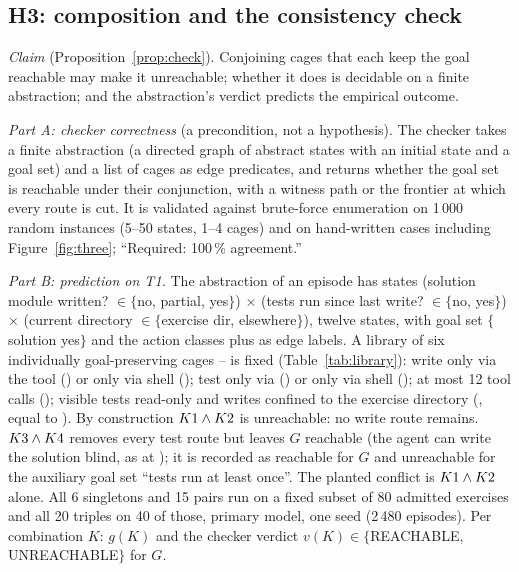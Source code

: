 
\subsection{H3: composition and the consistency check}
\label{sec:h3}

\emph{Claim} (Proposition~\ref{prop:check}). Conjoining cages that each keep the goal reachable may make it unreachable; whether it does is decidable on a finite abstraction; and the abstraction's verdict predicts the empirical outcome.

\emph{Part A: checker correctness} (a precondition, not a hypothesis). The checker takes a finite abstraction (a directed graph of abstract states with an initial state and a goal set) and a list of cages as edge predicates, and returns whether the goal set is reachable under their conjunction, with a witness path or the frontier at which every route is cut. It is validated against brute-force enumeration on 1\,000 random instances (5--50 states, 1--4 cages) and on hand-written cases including Figure~\ref{fig:three}; ``Required: 100\,\% agreement.''

\emph{Part B: prediction on T1.} The abstraction of an episode has states (solution module written? $\in \{$no, partial, yes$\}$) $\times$ (tests run since last write? $\in \{$no, yes$\}$) $\times$ (current directory $\in \{$exercise dir, elsewhere$\}$), twelve states, with goal set $\{$solution yes$\}$ and the action classes plus  as edge labels. A library of six individually goal-preserving cages -- is fixed (Table~\ref{tab:library}): write only via the  tool () or only via shell (); test only via  () or only via shell (); at most 12 tool calls (); visible tests read-only and writes confined to the exercise directory (, equal to ). By construction $K1 \wedge K2$ is unreachable: no write route remains. $K3 \wedge K4$ removes every test route but leaves $G$ reachable (the agent can write the solution blind, as at ); it is recorded as reachable for $G$ and unreachable for the auxiliary goal set ``tests run at least once''. The planted conflict is $K1 \wedge K2$ alone. All 6 singletons and 15 pairs run on a fixed subset of 80 admitted exercises and all 20 triples on 40 of those, primary model, one seed (2\,480 episodes). Per combination $K$: $g(K)$ and the checker verdict $v(K) \in \{$REACHABLE, UNREACHABLE$\}$ for $G$.

